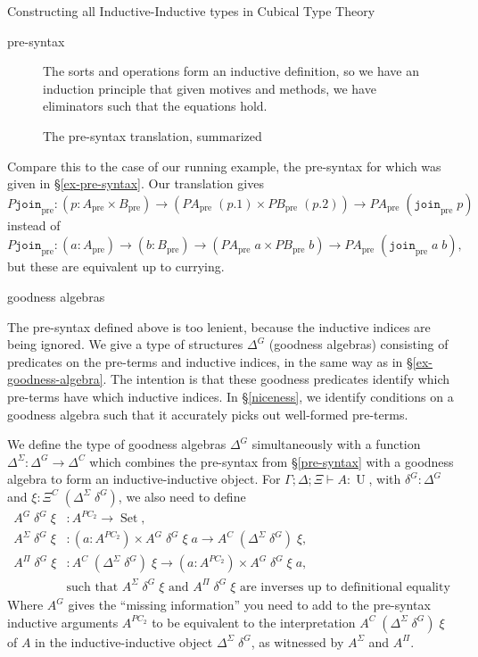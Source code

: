 \documentclass[acmsmall,review]{acmart}\settopmatter{printfolios=true,printccs=false,printacmref=false}
\DeclareMathOperator{\USet}{Set}
\DeclareMathOperator{\UU}{U}
\newcommand{\pre}[1]{{#1}_\text{pre}}
\newcommand{\tac}{\vdash}
\newcommand{\join}{\texttt{join}}
\begin{document}
\begin{section}{Constructing all Inductive-Inductive types in Cubical Type Theory}
\begin{subsection}{pre-syntax}
\begin{figure}[htpb]
\begin{flushleft}
    The sorts and operations form an inductive definition, so we have an induction principle that given motives and methods, we have eliminators such that the equations hold.
    \end{flushleft}
    
    \caption{\label{pre-syntax-translation}The pre-syntax translation, summarized}
\end{figure}

Compare this to the case of our running example, the pre-syntax for which was given in \S\ref{ex-pre-syntax}. Our translation gives \[\pre{P\join} : (p : \pre{A} \times \pre{B}) \to (\pre{PA}\;(p.1)\times \pre{PB}\;(p.2)) \to \pre{PA}\;(\pre{\join}\;p)\] instead of \[\pre{P\join} : (a : \pre{A}) \to (b : \pre{B}) \to (\pre{PA}\;a \times \pre{PB}\;b) \to \pre{PA}\;(\pre{\join}\;a\;b),\] but these are equivalent up to currying.

\end{subsection}
\begin{subsection}{goodness algebras}\label{goodness-algebra}

The pre-syntax defined above is too lenient, because the inductive indices are being ignored. We give a type of structures $\Delta^G$ (goodness algebras) consisting of predicates on the pre-terms and inductive indices, in the same way as in \S\ref{ex-goodness-algebra}. The intention is that these goodness predicates identify which pre-terms have which inductive indices. In \S\ref{niceness}, we identify conditions on a goodness algebra such that it accurately picks out well-formed pre-terms.

\begin{definition}
We define the type of goodness algebras $\Delta^G$ simultaneously with a function $\Delta^{\Sigma} : \Delta^G \to \Delta^C$ which combines the pre-syntax from \S\ref{pre-syntax} with a goodness algebra to form an inductive-inductive object. For $\Gamma ; \Delta ; \Xi \tac A : \UU$, with $\delta^G : \Delta^G$ and $\xi : \Xi^C\;(\Delta^\Sigma\;\delta^G)$, we also need to define
\begin{align*}
A^G\;\delta^G\;\xi &: A^{PC_2} \to \USet,\\
A^\Sigma\;\delta^G\;\xi &: (a : A^{PC_2}) \times A^G\;\delta^G\;\xi\;a \to A^C\;(\Delta^\Sigma\;\delta^G)\;\xi,\\
A^{\Pi}\;\delta^G\;\xi &:A^C\;(\Delta^\Sigma\;\delta^G)\;\xi \to (a : A^{PC_2}) \times A^G\;\delta^G\;\xi\;a,\\
&\text{such that $A^\Sigma\;\delta^G\;\xi$ and $A^{\Pi}\;\delta^G\;\xi$ are inverses up to definitional equality}
\end{align*}
Where $A^G$ gives the ``missing information'' you need to add to the pre-syntax inductive arguments $A^{PC_2}$ to be equivalent to the interpretation $A^C\;(\Delta^\Sigma\;\delta^G)\;\xi$ of $A$ in the inductive-inductive object $\Delta^\Sigma\;\delta^G$, as witnessed by $A^\Sigma$ and $A^\Pi$.


\end{definition}
\end{subsection}
\end{section}
\end{document}

